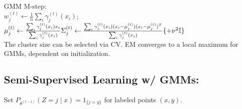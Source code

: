 GMM M-step:\\ $w_j^{(t)} \leftarrow \frac{1}{n} \sum_{i} \gamma_j^{(t)} (x_i)$; \\
$\mu_j^{(t)} \leftarrow \frac{\sum_{i} \gamma_j^{(t)} (x_i) x_i}{\sum_{i} \gamma_j^{(t)} (x_i)}\\ %
\Sigma_j^{(t)} \leftarrow \frac{\sum_{i} \gamma_j^{(t)}(x_i) (x_i - \mu_j^{(t)}) (x_i - \mu_j^{(t)})^T}{\sum_{i} \gamma_j^{(t)}(x_i)} \{+\nu^2\mathbb{I}\}$\\ %

The cluster size can be selected via CV.
EM converges to a local maximum for GMMs, dependent on
initialization.
\subsection*{Semi-Supervised Learning w/ GMMs:}
Set $P_{\theta^{(t-1)}}(Z=j\mid x) =1_{\{j = y\}}$ for labeled points
$(x,y).$
\\

